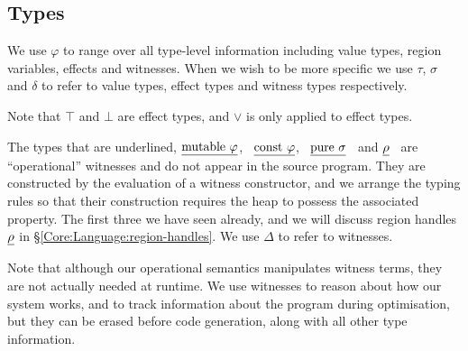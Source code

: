 \bigskip
\subsection{Types}
We use $\varphi$ to range over all type-level information including value types, region variables, effects and witnesses. When we wish to be more specific we use $\tau$, $\sigma$ and $\delta$ to refer to value types, effect types and witness types respectively. 

Note that $\top$ and $\bot$ are effect types, and $\lor$ is only applied to effect types.

The types that are underlined, $\underline{\textrm{mutable} \ \varphi}$, \ $\underline{\textrm{const} \ \varphi}$, \ $\underline{\textrm{pure} \ \sigma}$ \ and $\underline{\rho}$ \ are \mbox{``operational''} witnesses and do not appear in the source program. They are constructed by the evaluation of a witness constructor, and we arrange the typing rules so that their construction requires the heap to possess the associated property. The first three we have seen already, and we will discuss region handles $\underline{\rho}$ in \S\ref{Core:Language:region-handles}. We use $\Delta$ to refer to witnesses.

Note that although our operational semantics manipulates witness terms, they are not actually needed at runtime. We use witnesses to reason about how our system works, and to track information about the program during optimisation, but they can be erased before code generation, along with all other type information.

